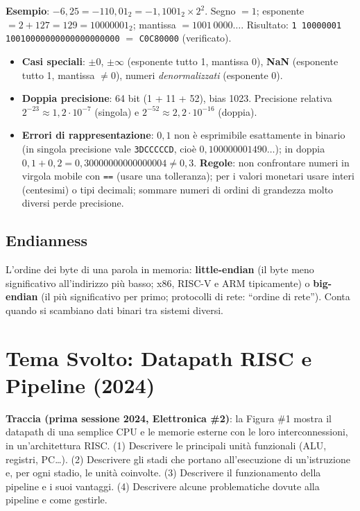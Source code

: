 \textbf{Esempio}: $-6{,}25 = -110{,}01_2 = -1{,}1001_2\times 2^{2}$. Segno $=1$; esponente $=2+127=129 = 10000001_2$; mantissa $=1001\,0000\ldots$. Risultato: \texttt{1 10000001 10010000000000000000000} $=$ \texttt{C0C80000} (verificato).
\begin{itemize}
    \item \textbf{Casi speciali}: $\pm 0$, $\pm\infty$ (esponente tutto 1, mantissa 0), \textbf{NaN} (esponente tutto 1, mantissa $\neq 0$), numeri \emph{denormalizzati} (esponente 0).
    \item \textbf{Doppia precisione}: 64 bit (1 + 11 + 52), bias 1023. Precisione relativa $2^{-23}\approx 1{,}2\cdot10^{-7}$ (singola) e $2^{-52}\approx 2{,}2\cdot 10^{-16}$ (doppia).
    \item \textbf{Errori di rappresentazione}: $0{,}1$ non è esprimibile esattamente in binario (in singola precisione vale \texttt{3DCCCCCD}, cioè $0{,}100000001490\ldots$); in doppia $0{,}1+0{,}2 = 0{,}30000000000000004 \neq 0{,}3$. \textbf{Regole}: non confrontare numeri in virgola mobile con \texttt{==} (usare una tolleranza); per i valori monetari usare interi (centesimi) o tipi decimali; sommare numeri di ordini di grandezza molto diversi perde precisione.
\end{itemize}

\subsection{Endianness}
L'ordine dei byte di una parola in memoria: \textbf{little-endian} (il byte meno significativo all'indirizzo più basso; x86, RISC-V e ARM tipicamente) o \textbf{big-endian} (il più significativo per primo; protocolli di rete: ``ordine di rete''). Conta quando si scambiano dati binari tra sistemi diversi.

\section{Tema Svolto: Datapath RISC e Pipeline (2024)}
\textbf{Traccia (prima sessione 2024, Elettronica \#2)}: la Figura \#1 mostra il datapath di una semplice CPU e le memorie esterne con le loro interconnessioni, in un'architettura RISC. (1) Descrivere le principali unità funzionali (ALU, registri, PC\ldots). (2) Descrivere gli stadi che portano all'esecuzione di un'istruzione e, per ogni stadio, le unità coinvolte. (3) Descrivere il funzionamento della pipeline e i suoi vantaggi. (4) Descrivere alcune problematiche dovute alla pipeline e come gestirle.

